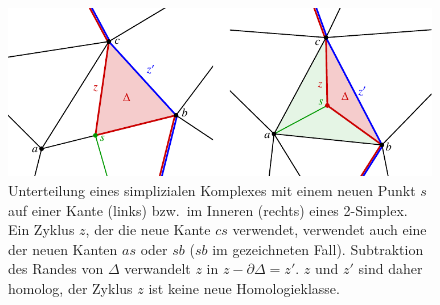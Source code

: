 %
%
%
\begin{figure}
\centering
\includegraphics{chapters/120-topologie/images/unterzyklen.pdf}
\caption{Unterteilung eines simplizialen Komplexes mit einem neuen Punkt $s$
auf einer Kante (links) bzw.~im Inneren (rechts) eines 2-Simplex.
Ein Zyklus $z$, der die neue Kante $cs$ verwendet, verwendet auch eine der
neuen Kanten $as$ oder $sb$ ($sb$ im gezeichneten Fall).
Subtraktion des Randes von $\Delta$ verwandelt $z$ in $z-\partial\Delta = z'$.
$z$ und $z'$ sind daher homolog, der Zyklus $z$ ist keine neue
Homologieklasse.
\label{buch:topologie:simplex:fig:unterzyklen}}
\end{figure}
